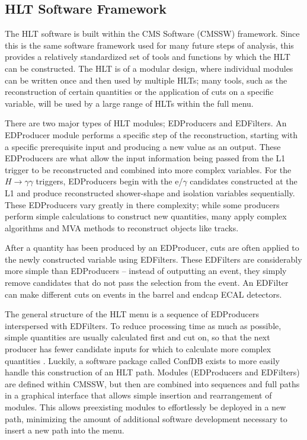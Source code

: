 \documentclass[12pt]{ucsddissertation}
\begin{document}
\subsection{HLT Software Framework}\label{sec:TriggerSoftware}
The HLT software is built within the CMS Software (CMSSW) framework. Since this is the same software framework used for many future steps of analysis, this provides a relatively standardized set of tools and functions by which the HLT can be constructed. The HLT is of a modular design, where individual modules can be written once and then used by multiple HLTs; many tools, such as the reconstruction of certain quantities or the application of cuts on a specific variable, will be used by a large range of HLTs within the full menu.

There are two major types of HLT modules; EDProducers and EDFilters. An EDProducer module performs a specific step of the reconstruction, starting with a specific prerequisite input and producing a new value as an output. These EDProducers are what allow the input information being passed from the L1 trigger to be reconstructed and combined into more complex variables. For the $H \rightarrow \gamma \gamma$ triggers, EDProducers begin with the e/$\gamma$ candidates constructed at the L1 and produce reconstructed shower-shape and isolation variables sequentially. These EDProducers vary greatly in there complexity; while some producers perform simple calculations to construct new quantities, many apply complex algorithms and MVA methods to reconstruct objects like tracks. 

After a quantity has been produced by an EDProducer, cuts are often applied to the newly constructed variable using EDFilters. These EDFilters are considerably more simple than EDProducers -- instead of outputting an event, they simply remove candidates that do not pass the selection from the event. An EDFilter can make different cuts on events in the barrel and endcap ECAL detectors.

The general structure of the HLT menu is a sequence of EDProducers interspersed with EDFilters. To reduce processing time as much as possible, simple quantities are usually calculated first and cut on, so that the next producer has fewer candidate inputs for which to calculate more complex quantities \cite{OfflineReco2021}. Luckily, a software package called ConfDB exists to more easily handle this construction of an HLT path. Modules (EDProducers and EDFilters) are defined within CMSSW, but then are combined into sequences and full paths in a graphical interface that allows simple insertion and rearrangement of modules. This allows preexisting modules to effortlessly be deployed in a new path, minimizing the amount of additional software development necessary to insert a new path into the menu. 
\end{document}
